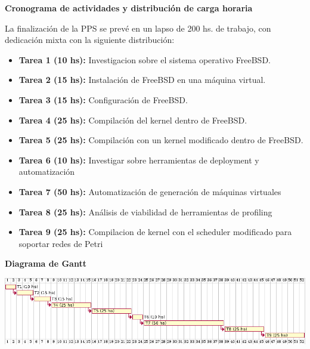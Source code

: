 \documentclass[a4paper, 15pt]{article}
\begin{document}
\begin{flushleft}
	\Huge
	\textbf{Cronograma de actividades y distribución de carga horaria}
	\vspace{0.7cm}
	
	\large
	La finalización de la PPS se prevé en un lapso de 200 hs. de trabajo, con dedicación mixta con la siguiente distribución:
	
	\large
	\begin{itemize}
		\item \textbf{Tarea 1 (10 hs):} Investigacion sobre el sistema operativo FreeBSD.
		\item \textbf{Tarea 2 (15 hs):} Instalación de FreeBSD en una máquina virtual.
		\item \textbf{Tarea 3 (15 hs):} Configuración de FreeBSD.
		\item \textbf{Tarea 4 (25 hs):} Compilación del kernel dentro de FreeBSD.
		\item \textbf{Tarea 5 (25 hs):} Compilación con un kernel modificado dentro de FreeBSD.
		\item \textbf{Tarea 6 (10 hs):} Investigar sobre herramientas de deployment y automatización
		\item \textbf{Tarea 7 (50 hs):} Automatización de generación de máquinas virtuales
		\item \textbf{Tarea 8 (25 hs):} Análisis de viabilidad de herramientas de profiling 
		\item \textbf{Tarea 9 (25 hs):} Compilacion de kernel con el scheduler modificado para soportar redes de Petri
	\end{itemize}
	\vspace{0.7cm}
	\Large
	\textbf{Diagrama de Gantt}
	\vspace{1cm}

	\includegraphics[width=16cm]{recursos/gantt_diagram}
\end{flushleft}
\end{document}
